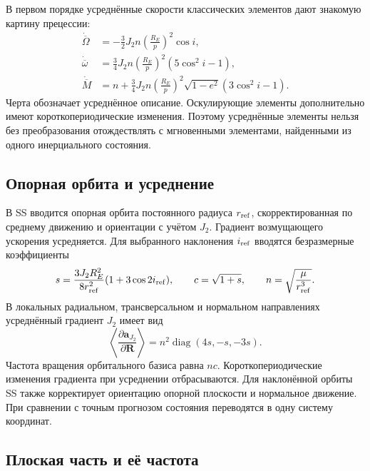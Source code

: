 \documentclass[a4paper,11pt]{article}
\numberwithin{equation}{section}
\theoremstyle{remark}
\newcommand{\vect}[1]{\boldsymbol{#1}}
\DeclareMathOperator{\diag}{diag}
\begin{document}
В первом порядке усреднённые скорости классических элементов
дают знакомую картину прецессии:
\begin{equation}
 \begin{aligned}
 \dot{\overline\Omega}
 &=-\frac32J_2n\left(\frac{R_E}{p}\right)^2\cos i,\\
 \dot{\overline\omega}
 &=\frac34J_2n\left(\frac{R_E}{p}\right)^2(5\cos^2i-1),\\
 \dot{\overline M}
 &=n+\frac34J_2n\left(\frac{R_E}{p}\right)^2
                   \sqrt{1-e^2}(3\cos^2i-1).
 \end{aligned}
 \label{eq:J2-secular}
\end{equation}
Черта обозначает усреднённое описание.
Оскулирующие элементы дополнительно имеют короткопериодические
изменения. Поэтому усреднённые элементы нельзя без преобразования
отождествлять с мгновенными элементами, найденными из одного
инерциального состояния.

\subsection{Опорная орбита и усреднение}

В SS вводится опорная орбита постоянного радиуса $r_{\rm ref}$,
скорректированная по среднему движению и ориентации
с учётом $J_2$. Градиент возмущающего ускорения усредняется.
Для выбранного наклонения $i_{\rm ref}$
вводятся безразмерные коэффициенты
\begin{equation}
 s=\frac{3J_2R_E^2}{8r_{\rm ref}^2}
                   (1+3\cos2i_{\rm ref}),\qquad
 c=\sqrt{1+s},\qquad n=\sqrt{\frac{\mu}{r_{\rm ref}^3}}.
 \label{eq:SS-constants}
\end{equation}
В локальных радиальном, трансверсальном и нормальном
направлениях усреднённый градиент $J_2$ имеет вид
\begin{equation}
 \left\langle\frac{\partial\vect a_{J_2}}
                         {\partial\vect R}\right\rangle
 =n^2\diag(4s,-s,-3s).
 \label{eq:SS-averaged-gradient}
\end{equation}
Частота вращения орбитального базиса равна $nc$.
Короткопериодические изменения градиента при усреднении
отбрасываются. Для наклонённой орбиты SS также корректирует
ориентацию опорной плоскости и нормальное движение.
При сравнении с точным прогнозом состояния переводятся
в одну систему координат.

\subsection{Плоская часть и её частота}
\end{document}
